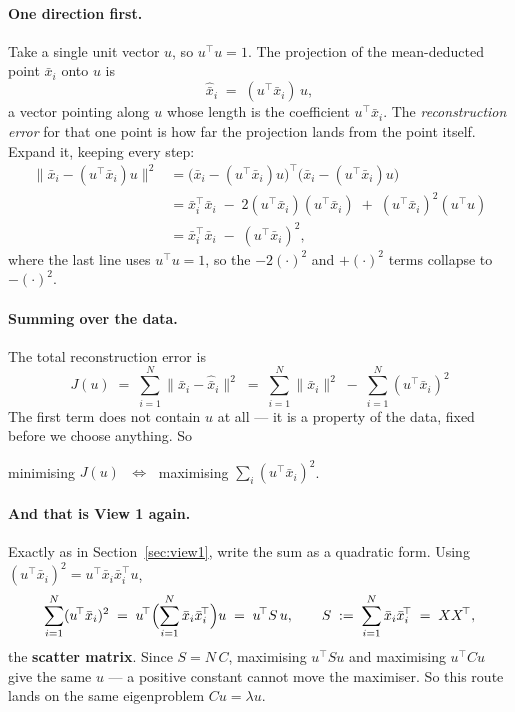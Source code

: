 \documentclass[11pt]{article}
\theoremstyle{definition}
\theoremstyle{remark}
\begin{document}
\paragraph{One direction first.} Take a single unit vector $u$, so $u^{\!\top}u=1$.
The projection of the mean-deducted point $\bar{x}_i$ onto $u$ is
\[
  \hat{\bar{x}}_i \;=\; (u^{\!\top}\bar{x}_i)\,u ,
\]
a vector pointing along $u$ whose length is the coefficient $u^{\!\top}\bar{x}_i$.
The \emph{reconstruction error} for that one point is how far the projection lands
from the point itself. Expand it, keeping every step:
\[
\begin{aligned}
  \bigl\|\bar{x}_i - (u^{\!\top}\bar{x}_i)u\bigr\|^2
  &= \bigl(\bar{x}_i - (u^{\!\top}\bar{x}_i)u\bigr)^{\!\top}\bigl(\bar{x}_i - (u^{\!\top}\bar{x}_i)u\bigr) \\
  &= \bar{x}_i^{\!\top}\bar{x}_i \;-\; 2(u^{\!\top}\bar{x}_i)(u^{\!\top}\bar{x}_i) \;+\; (u^{\!\top}\bar{x}_i)^2 (u^{\!\top}u) \\
  &= \bar{x}_i^{\!\top}\bar{x}_i \;-\; (u^{\!\top}\bar{x}_i)^2 ,
\end{aligned}
\]
where the last line uses $u^{\!\top}u=1$, so the $-2(\cdot)^2$ and $+(\cdot)^2$
terms collapse to $-(\cdot)^2$.

\paragraph{Summing over the data.} The total reconstruction error is
\[
  \boxed{\;J(u) \;=\; \sum_{i=1}^{N}\bigl\|\bar{x}_i - \hat{\bar{x}}_i\bigr\|^2
       \;=\; \sum_{i=1}^{N}\|\bar{x}_i\|^2 \;-\; \sum_{i=1}^{N}(u^{\!\top}\bar{x}_i)^2 \;}
\]
The first term does not contain $u$ at all --- it is a property of the data, fixed
before we choose anything. So
\begin{center}
minimising $J(u)$ $\;\Longleftrightarrow\;$ maximising $\sum_i (u^{\!\top}\bar{x}_i)^2$.
\end{center}

\paragraph{And that is View 1 again.} Exactly as in Section~\ref{sec:view1}, write
the sum as a quadratic form. Using $(u^{\!\top}\bar{x}_i)^2 = u^{\!\top}\bar{x}_i\bar{x}_i^{\!\top}u$,
\[
  \sum_{i=1}^{N}(u^{\!\top}\bar{x}_i)^2
  \;=\; u^{\!\top}\Bigl(\sum_{i=1}^{N}\bar{x}_i\bar{x}_i^{\!\top}\Bigr)u
  \;=\; u^{\!\top} S\,u ,
  \qquad S \;:=\; \sum_{i=1}^{N}\bar{x}_i\bar{x}_i^{\!\top} \;=\; XX^{\!\top},
\]
the \textbf{scatter matrix}. Since $S = N\,C$, maximising $u^{\!\top}Su$ and
maximising $u^{\!\top}Cu$ give the same $u$ --- a positive constant cannot move the
maximiser. So this route lands on the same eigenproblem $Cu=\lambda u$.
\end{document}
